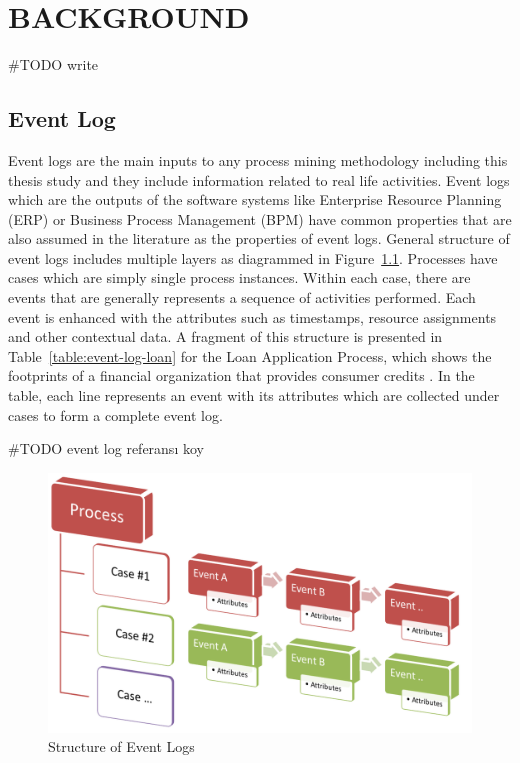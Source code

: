 
\chapter{BACKGROUND}
\label{chp:background}
#TODO write

\section{Event Log}
\label{sec:event-log}
Event logs are the main inputs to any process mining methodology including this thesis study and they include information related to real life activities. Event logs which are the outputs of the software systems like Enterprise Resource Planning (ERP) or Business Process Management (BPM) have common properties that are also assumed in the literature as the properties of event logs. General structure of event logs includes multiple layers as diagrammed in Figure~\ref{fig:event-log-structure}. Processes have cases which are simply single process instances. Within each case, there are events that are generally represents a sequence of activities performed. Each event is enhanced with the attributes such as timestamps, resource assignments and other contextual data. A fragment of this structure is presented in Table~\ref{table:event-log-loan} for the Loan Application Process, which shows the footprints of a financial organization that provides consumer credits \cite{buijs2013improving}. In the table, each line represents an event with its attributes which are collected under cases to form a complete event log. 

#TODO event log referansı koy

\begin{figure}
  \centering
  \includegraphics[width=\textwidth]{3_background/event_log_structure}
  \caption{Structure of Event Logs}
  \label{fig:event-log-structure}
\end{figure}


